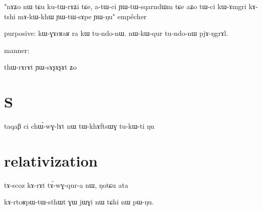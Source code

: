 \documentclass[oldfontcommands,oneside,a4paper,11pt]{article}
\newcommand{\ipa}[1]{{\phon #1}} %
\begin{document}
"nɤʑo nɯ tɕu ku-tɯ-rɤʑi tɕe, a-tɯ-ci ɲɯ-tɯ-sqarndɯm tɕe aʑo
tɯ-ci kɯ-ɤmgri kɤ-tshi mɤ-kɯ-khɯ ɲɯ-tɯ-sɤpe ɲɯ-ŋu"
empêcher

purposive:
kɯ-ɣɤrʁaʁ ra kɯ tu-ndo-nɯ.
nɯ-kɯ-qur tu-ndo-nɯ pjɤ-ŋgrɤl.

  
 
manner:

thɯ-rɤrɤt ɲɯ-sɤʂɤʂɤt ʑo

\section{S}

\ipa{taqaβ} 	\ipa{ci} 	\ipa{chɯ́-wɣ-lɤt} 	\ipa{nɯ} 	\ipa{tɯ-khɤftsɯɣ} 	\ipa{tu-kɯ-ti} 	\ipa{ŋu} 


\section{relativization}
tɤ-scoz kɤ-rɤt tɤ́-wɣ-qur-a nɯ, ŋotɕu ata

kɤ-rtoʁpɯ-tɯ-sthɯt ɣɯ jɯɣi nɯ tɕhi nɯ pɯ-ŋu.



\end{document}
